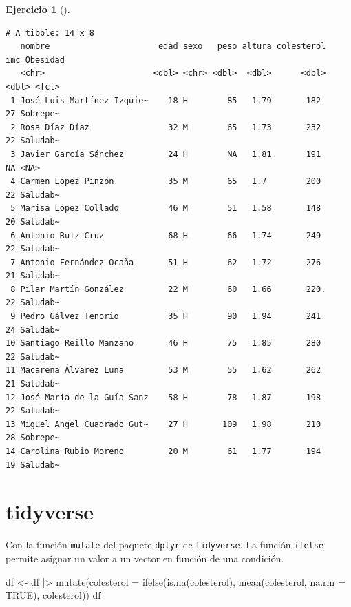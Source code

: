 \documentclass[
  a4paper,
]{scrreport}
\newenvironment{Shaded}{\begin{snugshade}}{\end{snugshade}}
\newcommand{\AttributeTok}[1]{\textcolor[rgb]{0.40,0.45,0.13}{#1}}
\newcommand{\ConstantTok}[1]{\textcolor[rgb]{0.56,0.35,0.01}{#1}}
\newcommand{\FunctionTok}[1]{\textcolor[rgb]{0.28,0.35,0.67}{#1}}
\newcommand{\NormalTok}[1]{\textcolor[rgb]{0.00,0.23,0.31}{#1}}
\newcommand{\OtherTok}[1]{\textcolor[rgb]{0.00,0.23,0.31}{#1}}
\newcommand{\SpecialCharTok}[1]{\textcolor[rgb]{0.37,0.37,0.37}{#1}}
\theoremstyle{definition}
\newtheorem{exercise}{Ejercicio}[chapter]
\theoremstyle{remark}
\begin{document}
\begin{exercise}[]
\begin{enumerate}
\begin{tcolorbox}
\begin{Shaded}
\end{Shaded}

\begin{verbatim}
# A tibble: 14 x 8
   nombre                      edad sexo   peso altura colesterol   imc Obesidad
   <chr>                      <dbl> <chr> <dbl>  <dbl>      <dbl> <dbl> <fct>   
 1 José Luis Martínez Izquie~    18 H        85   1.79       182     27 Sobrepe~
 2 Rosa Díaz Díaz                32 M        65   1.73       232     22 Saludab~
 3 Javier García Sánchez         24 H        NA   1.81       191     NA <NA>    
 4 Carmen López Pinzón           35 M        65   1.7        200     22 Saludab~
 5 Marisa López Collado          46 M        51   1.58       148     20 Saludab~
 6 Antonio Ruiz Cruz             68 H        66   1.74       249     22 Saludab~
 7 Antonio Fernández Ocaña       51 H        62   1.72       276     21 Saludab~
 8 Pilar Martín González         22 M        60   1.66       220.    22 Saludab~
 9 Pedro Gálvez Tenorio          35 H        90   1.94       241     24 Saludab~
10 Santiago Reillo Manzano       46 H        75   1.85       280     22 Saludab~
11 Macarena Álvarez Luna         53 M        55   1.62       262     21 Saludab~
12 José María de la Guía Sanz    58 H        78   1.87       198     22 Saludab~
13 Miguel Angel Cuadrado Gut~    27 H       109   1.98       210     28 Sobrepe~
14 Carolina Rubio Moreno         20 M        61   1.77       194     19 Saludab~
\end{verbatim}

  \section{tidyverse}

  Con la función \texttt{mutate} del paquete \texttt{dplyr} de
  \texttt{tidyverse}. La función \texttt{ifelse} permite asignar un
  valor a un vector en función de una condición.

\begin{Shaded}
\begin{Highlighting}[]
\NormalTok{df }\OtherTok{\textless{}{-}}\NormalTok{ df }\SpecialCharTok{|\textgreater{}}
    \FunctionTok{mutate}\NormalTok{(}\AttributeTok{colesterol =} \FunctionTok{ifelse}\NormalTok{(}\FunctionTok{is.na}\NormalTok{(colesterol), }\FunctionTok{mean}\NormalTok{(colesterol, }\AttributeTok{na.rm =} \ConstantTok{TRUE}\NormalTok{), colesterol))}
\NormalTok{df}
\end{Highlighting}
\end{Shaded}


\end{tcolorbox}
\end{enumerate}
\end{exercise}
\end{document}
